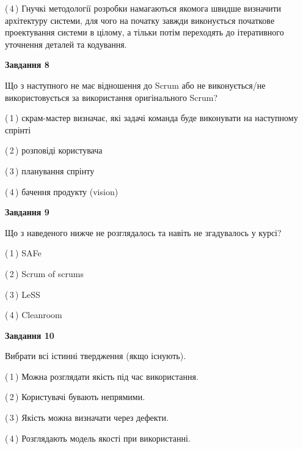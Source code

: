 \documentclass[10pt, ukrainian]{article}
\begin{document}
{\begin {large}
(\,4\,) Гнучкі методології розробки намагаються якомога швидше визначити архітектуру системи, для чого на початку завжди виконується початкове проектування системи в цілому, а тільки потім переходять до ітеративного уточнення деталей та кодування. %


{\begin {center}\textbf{Завдання 8}\end {center}}\par
Що з наступного не має відношення до Scrum або не виконується/не використовується за використання оригінального Scrum?\par
\vspace{2mm}



(\,1\,) скрам-мастер визначає, які задачі команда буде виконувати на наступному спрінті%



(\,2\,) розповіді користувача%



(\,3\,) планування спрінту%



(\,4\,) бачення продукту (vision) %


{\begin {center}\textbf{Завдання 9}\end {center}}\par
Що з наведеного нижче не розглядалось та навіть не згадувалось у курсі?\par
\vspace{2mm}



(\,1\,) SAFe%



(\,2\,) Scrum of scrums%



(\,3\,) LeSS%



(\,4\,) Cleanroom%


{\begin {center}\textbf{Завдання 10}\end {center}}\par
Вибрати всі істинні твердження (якщо існують).\par
\vspace{2mm}



(\,1\,) Можна розглядати якість під час використання.%



(\,2\,) Користувачі бувають непрямими.%



(\,3\,) Якість можна визначати через дефекти.%



(\,4\,) Розглядають модель якості при використанні.%



\end {large}}
\end{document}
